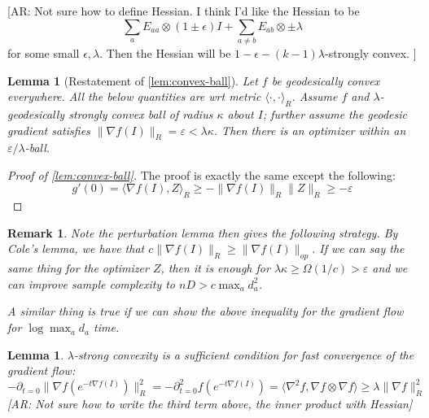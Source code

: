 \documentclass{article}
\newtheorem{lemma}[theorem]{Lemma}
\newtheorem{remark}{Remark}
\newcommand\eps{\varepsilon}
\newcommand\tr{\operatorname{Tr}}
\newcommand{\AR}[1]{{\color{orange}[AR: #1]}}
\begin{document}
\AR{Not sure how to define Hessian. I think I'd like the Hessian to be 
\[  \sum_{a} E_{aa} \otimes (1 \pm \epsilon) I + \sum_{a \neq b} E_{ab} \otimes \pm \lambda  \]
for some small $\epsilon,\lambda$. Then the Hessian will be $1-\epsilon - (k-1) \lambda$-strongly convex. }



\begin{lemma} [Restatement of \cref{lem:convex-ball}]
Let $f$ be geodesically convex everywhere. All the below quantities are wrt metric $\langle \cdot, \cdot \rangle_{R}$. Assume $f$ and $\lambda$-geodesically strongly convex ball of radius $\kappa$ about $I$; further assume the geodesic gradient satisfies $\|\nabla f(I)\|_{R} = \eps < \lambda \kappa$. Then there is an optimizer within an $\eps/\lambda$-ball. 
\end{lemma}
\begin{proof} [Proof of \cref{lem:convex-ball}]
The proof is exactly the same except the following:
\[ g'(0) = \langle \nabla f(I), Z \rangle_{R} \geq - \|\nabla f(I)\|_{R} \|Z\|_{R} \geq - \eps     \]
\end{proof}

\begin{remark}
Note the perturbation lemma then gives the following strategy. By Cole's lemma, we have that $c \|\nabla f(I)\|_{R} \geq \|\nabla f(I)\|_{op}$. If we can say the same thing for the optimizer $Z$, then it is enough for $\lambda \kappa \geq \Omega(1/c) > \eps$ and we can improve sample complexity to $nD > c \max_{a} d_{a}^{2}$. 

A similar thing is true if we can show the above inequality for the gradient flow for $\log \max_{a} d_{a}$ time. 
\end{remark}

\begin{lemma}
$\lambda$-strong convexity is a sufficient condition for fast convergence of the gradient flow:
\[ - \partial_{t=0} \|\nabla f(e^{-t\nabla f(I)})\|_{R}^{2} = -\partial_{t=0}^{2} f(e^{-t\nabla f(I)}) = \langle \nabla^{2} f, \nabla f \otimes \nabla f \rangle \geq \lambda \|\nabla f\|_{R}^{2}    \]
\AR{Not sure how to write the third term above, the inner product with Hessian}
\end{lemma}










\end{document}
